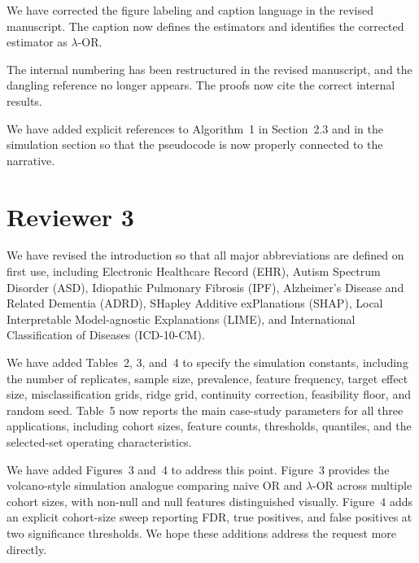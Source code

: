 \documentclass[onecolumn,11pt]{IEEEtran}
\begin{document}
We have corrected the figure labeling and caption language in the revised manuscript. The caption now defines the estimators and identifies the corrected estimator as $\lambda$-OR.

The internal numbering has been restructured in the revised manuscript, and the dangling reference no longer appears. The proofs now cite the correct internal results.

We have added explicit references to Algorithm~1 in Section~2.3 and in the simulation section so that the pseudocode is now properly connected to the narrative.

\section*{Reviewer 3}

We have revised the introduction so that all major abbreviations are defined on first use, including Electronic Healthcare Record (EHR), Autism Spectrum Disorder (ASD), Idiopathic Pulmonary Fibrosis (IPF), Alzheimer's Disease and Related Dementia (ADRD), SHapley Additive exPlanations (SHAP), Local Interpretable Model-agnostic Explanations (LIME), and International Classification of Diseases (ICD-10-CM).

We have added Tables~2, 3, and~4 to specify the simulation constants, including the number of replicates, sample size, prevalence, feature frequency, target effect size, misclassification grids, ridge grid, continuity correction, feasibility floor, and random seed. Table~5 now reports the main case-study parameters for all three applications, including cohort sizes, feature counts, thresholds, quantiles, and the selected-set operating characteristics.

We have added Figures~3 and~4 to address this point. Figure~3 provides the volcano-style simulation analogue comparing naive OR and $\lambda$-OR across multiple cohort sizes, with non-null and null features distinguished visually. Figure~4 adds an explicit cohort-size sweep reporting FDR, true positives, and false positives at two significance thresholds. We hope these additions address the request more directly.
\end{document}
